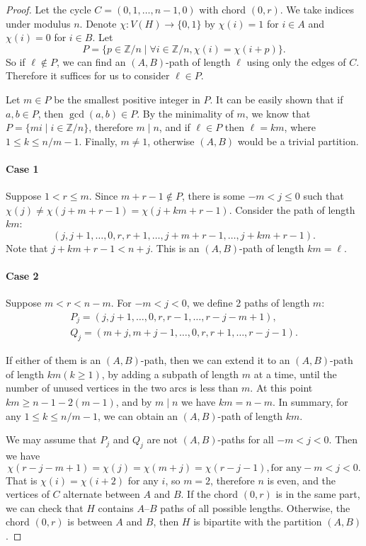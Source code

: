 \documentclass[12pt]{article}
\begin{document}
\begin{proof}
	Let the cycle $C=(0,1,\dots,n - 1,0)$ with chord $(0,r)$. We take indices under modulus $n$. Denote $\chi:V(H)\to\{0,1\}$ by $\chi(i)=1$ for $i\in A$ and $\chi(i)=0$ for $i\in B$. Let 
	$$P = \{p\in \mathbb{Z}/n \mid \forall i\in \mathbb{Z}/n, \chi(i)= \chi(i + p)\}.$$
	So if $\ell\notin P$, we can find an $(A,B)$-path of length $\ell$ using only the edges of $C$. Therefore it suffices for us to consider $\ell\in P$.

	Let $m\in P$ be the smallest positive integer in $P$. It can be easily shown that if $a,b\in P$, then $\gcd(a,b)\in P$. By the minimality of $m$, we know that $P=\{mi \mid i\in \mathbb{Z}/n\}$, therefore $m\mid n$, and if $\ell \in P$ then $\ell=km$, where $1\leq k\leq n/m-1$. Finally, $m\neq 1$, otherwise $(A,B)$ would be a trivial partition.

	\vspace{-1em}
	\paragraph{Case 1} Suppose $1<r\leq m$. Since $m + r - 1 \notin P$, there is some $-m<j\leq 0$ such that $\chi(j)\neq\chi(j + m + r - 1)=\chi(j + km + r - 1)$. Consider the path of length $km$:
	$$(j,j + 1,\ldots,0,r,r + 1,\ldots,j + m + r - 1,\ldots,j + km + r - 1).$$ 
	Note that $j+km+r-1<n+j$. This is an $(A,B)$-path of length $km=\ell$.

	\vspace{-1em}
	\paragraph{Case 2} Suppose $m<r<n - m$. For $-m<j<0$, we define 2 paths of length $m$: 
	$$\begin{gathered}
		P_j=(j,j + 1,\ldots,0,r,r - 1,\ldots,r - j - m + 1),\\
		Q_j=(m + j,m + j - 1,\ldots,0,r,r + 1,\ldots,r - j - 1).
	\end{gathered}$$

	If either of them is an $(A,B)$-path, then we can extend it to an $(A,B)$-path of length $km (k\geq 1)$, by adding a subpath of length $m$ at a time, until the number of unused vertices in the two arcs is less than $m$. At this point $km\geq n-1-2(m-1)$, and by $m\mid n$ we have $km=n-m$. In summary, for any $1\leq k\leq n/m-1$, we can obtain an $(A,B)$-path of length $km$.

	We may assume that $P_j$ and $Q_j$ are not $(A,B)$-paths for all $-m< j< 0$. Then we have 
	$$\chi(r - j - m + 1)=\chi(j)=\chi(m + j)=\chi(r - j - 1), \text{for any} -m<j<0.$$
	That is $\chi(i)=\chi(i + 2)$ for any $i$, so $m=2$, therefore $n$ is even, and the vertices of $C$ alternate between $A$ and $B$. If the chord $(0,r)$ is in the same part, we can check that $H$ contains $A$--$B$ paths of all possible lengths. Otherwise, the chord $(0,r)$ is between $A$ and $B$, then $H$ is bipartite with the partition $(A,B)$.


\end{proof}
\end{document}
